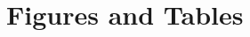 
\onecolumn %
\fancyhead{} %
\renewcommand{\floatpagefraction}{0.1}
\lfoot[\bSupInf]{\dAuthor}
\rfoot[\dAuthor]{\cSupInf}
\newpage

\captionsetup*{format=largeformat} %
\setcounter{figure}{0} %
\setcounter{table}{0} %
\setcounter{equation}{0} %
\makeatletter
\renewcommand{\thefigure}{S\@arabic\c@figure} %
\renewcommand{\thetable}{S\@arabic\c@table} %
\makeatother
\def\theequation{S\arabic{equation}}


\appendix
\section{Figures and Tables}

